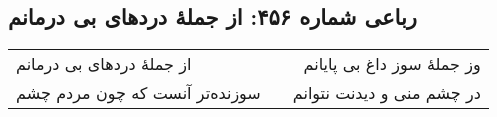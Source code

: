 \begin{center}
\section*{رباعی شماره ۴۵۶: از جملهٔ دردهای بی درمانم}
\label{sec:sh456}
\begin{longtable}{l p{0.5cm} r}
از جملهٔ دردهای بی درمانم
&&
وز جملهٔ سوز داغ بی پایانم
\\
سوزنده‌تر آنست که چون مردم چشم
&&
در چشم منی و دیدنت نتوانم
\\
\end{longtable}
\end{center}
